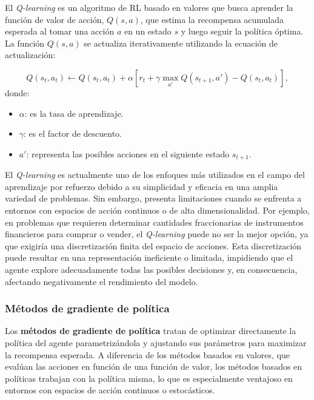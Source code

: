 \documentclass[11pt,a4paper,spanish]{article}
\numberwithin{equation}{section} %
\begin{document}
El \textit{Q-learning} es un algoritmo de RL basado en valores que busca aprender la función de valor de acción, $Q(s,a)$, que estima la recompensa acumulada esperada al tomar una acción $a$ en un estado $s$ y luego seguir la política óptima. La función $Q(s,a)$ se actualiza iterativamente utilizando la ecuación de actualización:

\begin{equation}
Q(s_t, a_t) \leftarrow Q(s_t, a_t) + \alpha \left[r_t + \gamma \max_{a'} Q(s_{t+1}, a') - Q(s_t, a_t)\right],
\end{equation}
donde:
\begin{itemize}
    \item $\alpha$: es la tasa de aprendizaje.
    \item $\gamma$: es el factor de descuento.
    \item $a'$: representa las posibles acciones en el siguiente estado $s_{t+1}$.
\end{itemize}

El \textit{Q-learning} es actualmente uno de los enfoques más utilizados en el campo del aprendizaje por refuerzo debido a su simplicidad y eficacia en una amplia variedad de problemas. Sin embargo, presenta limitaciones cuando se enfrenta a entornos con espacios de acción continuos o de alta dimensionalidad. Por ejemplo, en problemas que requieren determinar cantidades fraccionarias de instrumentos financieros para comprar o vender, el \textit{Q-learning} puede no ser la mejor opción, ya que exigiría una discretización finita del espacio de acciones. Esta discretización puede resultar en una representación ineficiente o limitada, impidiendo que el agente explore adecuadamente todas las posibles decisiones y, en consecuencia, afectando negativamente el rendimiento del modelo.


\subsubsection{Métodos de gradiente de política}

Los \textbf{métodos de gradiente de política} tratan de optimizar directamente la política del agente parametrizándola y ajustando sus parámetros para maximizar la recompensa esperada. A diferencia de los métodos basados en valores, que evalúan las acciones en función de una función de valor, los métodos basados en políticas trabajan con la política misma, lo que es especialmente ventajoso en entornos con espacios de acción continuos o estocásticos.
\end{document}
